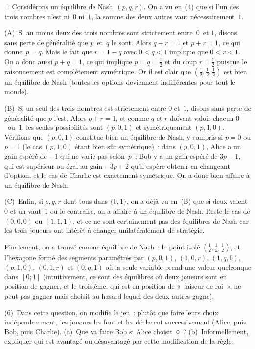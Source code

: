 \documentclass[12pt,a4paper]{article}
\theoremstyle{definition}
\newif\ifcorrige
\newenvironment{corrige}%
{\ifcorrige\relax\else\setbox0=\vbox\bgroup\fi%
\smallbreak\noindent{\underbar{\textit{Corrigé.}}\quad}}
{{\hbox{}\nobreak\hfill\checkmark}%
\ifcorrige\relax\else\egroup\fi\par}
\begin{document}
\begin{corrige}
Considérons un équilibre de Nash $(p,q,r)$.  On a vu en (4) que si
l'un des trois nombres n'est ni $0$ ni $1$, la somme des deux autres
vaut nécessairement $1$.

(A) Si au moins deux des trois nombres sont strictement entre $0$ et
$1$, disons sans perte de généralité que $p$ et $q$ le sont.  Alors
$q+r=1$ et $p+r=1$, ce qui donne $p=q$.  Mais le fait que $r=1-q$ avec
$0<q<1$ implique que $0<r<1$.  On a donc aussi $p+q=1$, ce qui
implique $p=q=\frac{1}{2}$ et du coup $r=\frac{1}{2}$ puisque le
raisonnement est complètement symétrique.  Or il est clair que
$(\frac{1}{2},\frac{1}{2},\frac{1}{2})$ est bien un équilibre de Nash
(toutes les options deviennent indifférentes pour tout le monde).

(B) Si un seul des trois nombres est strictement entre $0$ et $1$,
disons sans perte de généralité que $p$ l'est.  Alors $q+r=1$, et
comme $q$ et $r$ doivent valoir chacun $0$ ou $1$, les seules
possibilités sont $(p,0,1)$ et symétriquement $(p,1,0)$.  Vérifions
que $(p,0,1)$ constitue bien un équilibre de Nash, y compris si $p=0$
ou $p=1$ (le cas $(p,1,0)$ étant bien sûr symétrique) : dans
$(p,0,1)$, Alice a un gain espéré de $-1$ qui ne varie pas selon $p$ ;
Bob y a un gain espéré de $3p-1$, qui est supérieur ou égal au gain
$-3p+2$ qu'il espère obtenir en changeant d'option, et le cas de
Charlie est exactement symétrique.  On a donc bien affaire à un
équilibre de Nash.

(C) Enfin, si $p,q,r$ dont tous dans $\{0,1\}$, on a déjà vu en (B)
que si deux valent $0$ et un vaut $1$ ou le contraire, on a affaire à
un équilibre de Nash.  Reste le cas de $(0,0,0)$ ou $(1,1,1)$, et ce
ne sont certainement pas des équilibres de Nash car les trois joueurs
ont intérêt à changer unilatéralement de stratégie.

Finalement, on a trouvé comme équilibre de Nash : le point isolé
$(\frac{1}{2},\frac{1}{2},\frac{1}{2})$, et l'hexagone formé des
segments paramétrés par $(p,0,1)$, $(1,0,r)$, $(1,q,0)$, $(p,1,0)$,
$(0,1,r)$ et $(0,q,1)$ où la seule variable prend une valeur
quelconque dans $[0;1]$ (intuitivement, ce sont des équilibres où deux
joueurs sont en position de gagner, et le troisième, qui est en
position de « faiseur de roi », ne peut pas gagner mais choisit au
hasard lequel des deux autres gagne).
\end{corrige}

\smallbreak

(6) Dans cette question, on modifie le jeu : plutôt que faire leurs
choix indépendamment, les joueurs les font et les déclarent
successivement (Alice, puis Bob, puis Charlie).  (a) Que va faire Bob
si Alice choisit $\mathtt{0}$ ?  (b) Informellement, expliquer qui est
avantagé ou désavantagé par cette modification de la règle.
\end{document}
